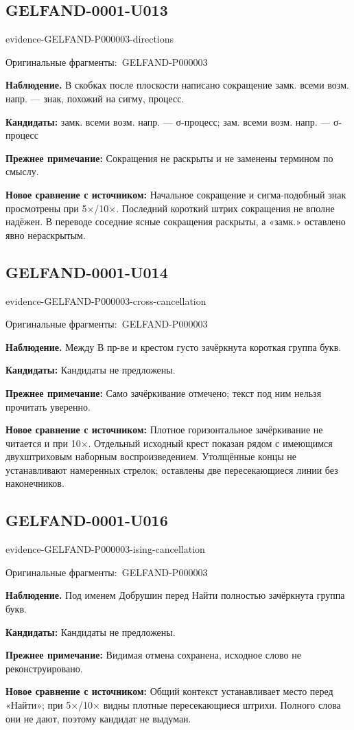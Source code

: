 \documentclass[11pt]{article}
\newcommand{\EvidenceBlock}[4]{%
 \par\smallskip\noindent\begin{minipage}{\linewidth}
 \begin{minipage}[t]{.47\linewidth}\vspace{0pt}\centering
 \csname evidence-#1-#2\endcsname\par
 {\scriptsize\SourceCropCaption\ #1}\par
 \end{minipage}\hfill
 \begin{minipage}[t]{.49\linewidth}\vspace{0pt}\raggedright
 {\small\color{orange!65!black}\textbf{#4} #3}\par
 \end{minipage}
 \end{minipage}\par\smallskip}
\newcommand{\SourceCropCaption}{Оригинальные фрагменты:}\newcommand{\ReadingCaption}{Сомнительное чтение.}\newcommand{\IncompleteCaption}{Неразобранный фрагмент.}\newcommand{\DiagramCaption}{Рисунок и набранное описание.}
\begin{document}
\subsection*{GELFAND-0001-U013}
\EvidenceBlock{GELFAND-P000003}{directions}{В скобках после плоскости написано сокращение замк. всеми возм. напр. — знак, похожий на сигму, процесс.}{Наблюдение.}
\par\smallskip\noindent\textbf{Кандидаты: } замк. всеми возм. напр. — σ-процесс; зам. всеми возм. напр. — σ-процесс\par
\par\smallskip\noindent\textbf{Прежнее примечание: } Сокращения не раскрыты и не заменены термином по смыслу.\par
\par\smallskip\noindent\textbf{Новое сравнение с источником: } Начальное сокращение и сигма-подобный знак просмотрены при 5×/10×. Последний короткий штрих сокращения не вполне надёжен. В переводе соседние ясные сокращения раскрыты, а «замк.» оставлено явно нераскрытым.\par

\subsection*{GELFAND-0001-U014}
\EvidenceBlock{GELFAND-P000003}{cross-cancellation}{Между В пр-ве и крестом густо зачёркнута короткая группа букв.}{Наблюдение.}
\par\smallskip\noindent\textbf{Кандидаты: } Кандидаты не предложены.\par
\par\smallskip\noindent\textbf{Прежнее примечание: } Само зачёркивание отмечено; текст под ним нельзя прочитать уверенно.\par
\par\smallskip\noindent\textbf{Новое сравнение с источником: } Плотное горизонтальное зачёркивание не читается и при 10×. Отдельный исходный крест показан рядом с имеющимся двухштриховым наборным воспроизведением. Утолщённые концы не устанавливают намеренных стрелок; оставлены две пересекающиеся линии без наконечников.\par

\subsection*{GELFAND-0001-U016}
\EvidenceBlock{GELFAND-P000003}{ising-cancellation}{Под именем Добрушин перед Найти полностью зачёркнута группа букв.}{Наблюдение.}
\par\smallskip\noindent\textbf{Кандидаты: } Кандидаты не предложены.\par
\par\smallskip\noindent\textbf{Прежнее примечание: } Видимая отмена сохранена, исходное слово не реконструировано.\par
\par\smallskip\noindent\textbf{Новое сравнение с источником: } Общий контекст устанавливает место перед «Найти»; при 5×/10× видны плотные пересекающиеся штрихи. Полного слова они не дают, поэтому кандидат не выдуман.\par
\end{document}
